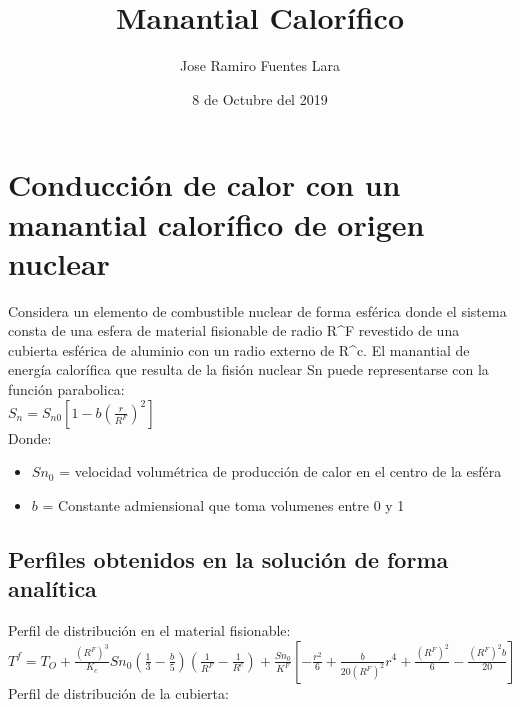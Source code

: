 \documentclass[11pt]{article}
\title{Manantial Calorífico}
\author{Jose Ramiro Fuentes Lara}
\date{8 de Octubre del 2019}
\providecommand{\tightlist}{%
      \setlength{\itemsep}{0pt}\setlength{\parskip}{0pt}}
\begin{document}
    
    
    \maketitle
    
    

    
    \hypertarget{conducciuxf3n-de-calor-con-un-manantial-caloruxedfico-de-origen-nuclear}{%
\section{Conducción de calor con un manantial calorífico de origen
nuclear}\label{conducciuxf3n-de-calor-con-un-manantial-caloruxedfico-de-origen-nuclear}}

Considera un elemento de combustible nuclear de forma esférica donde el
sistema consta de una esfera de material fisionable de radio R\^{}F
revestido de una cubierta esférica de aluminio con un radio externo de
R\^{}c. El manantial de energía calorífica que resulta de la fisión
nuclear Sn puede representarse con la función parabolica:\\

\(S_n=S_{n0}[1-b(\frac{r}{R^F})^2]\) \\

Donde:

\begin{itemize}
\tightlist
\item
  \(Sn_0\) = velocidad volumétrica de producción de calor en el centro
  de la esféra
\item
  \(b\) = Constante admiensional que toma volumenes entre 0 y 1
\end{itemize}

    \hypertarget{perfiles-obtenidos-en-la-soluciuxf3n-de-forma-analuxedtica}{%
\subsection{Perfiles obtenidos en la solución de forma
analítica}\label{perfiles-obtenidos-en-la-soluciuxf3n-de-forma-analuxedtica}}

Perfil de distribución en el material fisionable:\\

\(T^f={T_O+\frac{(R^{F})^3}{K_c}Sn_0(\frac{1}{3}-\frac{b}{5})(\frac{1}{R^F}-\frac{1}{R^c})}+\frac{Sn_0}{K^F}[-\frac{r^2}{6}+\frac{b}{20(R^F)^2}r^4 +\frac{(R^F)^2}{6}-\frac{(R^F)^2b}{20}]\)\\

Perfil de distribución de la cubierta:\\
\end{document}

